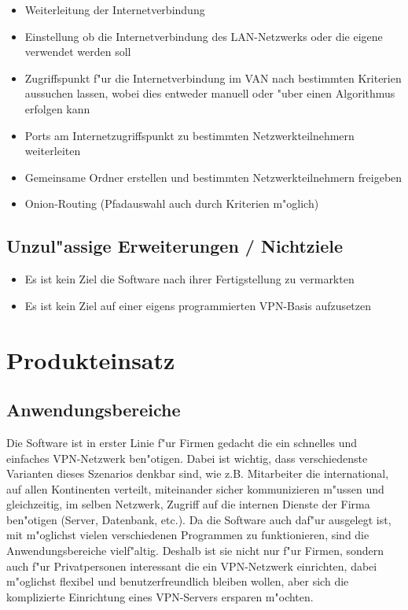 \documentclass[a4paper,12pt]{scrreprt}
\begin{document}
	\begin{itemize}
				\item Weiterleitung der Internetverbindung
				\item Einstellung ob die Internetverbindung des LAN-Netzwerks oder die eigene verwendet werden soll
				\item Zugriffspunkt f"ur die Internetverbindung im VAN nach bestimmten Kriterien aussuchen lassen, wobei dies entweder manuell oder "uber einen Algorithmus erfolgen kann
				
				\item Ports am Internetzugriffspunkt zu bestimmten Netzwerkteilnehmern weiterleiten
				\item Gemeinsame Ordner erstellen und bestimmten Netzwerkteilnehmern freigeben
				
				\item Onion-Routing (Pfadauswahl auch durch Kriterien m"oglich)
				
				\end{itemize}
	
	\section{Unzul"assige Erweiterungen / Nichtziele}
	
	\begin{itemize}
	\item Es ist kein Ziel die Software nach ihrer Fertigstellung zu vermarkten
	\item Es ist kein Ziel auf einer eigens programmierten VPN-Basis aufzusetzen
	
	\end{itemize}
	
	
\chapter{Produkteinsatz}
	
	\section{Anwendungsbereiche}
	 Die Software ist in erster Linie f"ur Firmen gedacht die ein schnelles und einfaches VPN-Netzwerk ben"otigen. Dabei ist wichtig, dass verschiedenste Varianten dieses Szenarios denkbar sind, wie z.B. Mitarbeiter die international, auf allen Kontinenten verteilt, miteinander sicher kommunizieren m"ussen und gleichzeitig, im selben Netzwerk, Zugriff auf die internen Dienste der Firma ben"otigen (Server, Datenbank, etc.). Da die Software auch daf"ur ausgelegt ist, mit m"oglichst vielen verschiedenen Programmen zu funktionieren, sind die Anwendungsbereiche vielf"altig. Deshalb ist sie nicht nur f"ur Firmen, sondern auch f"ur Privatpersonen interessant die ein VPN-Netzwerk einrichten, dabei m"oglichst flexibel und benutzerfreundlich bleiben wollen, aber sich die komplizierte Einrichtung eines VPN-Servers ersparen m"ochten.
\end{document}
